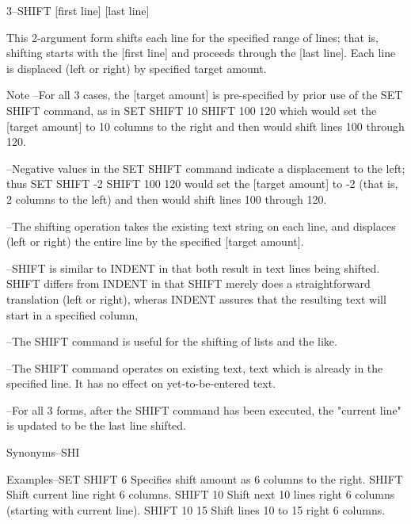        3--SHIFT   [first line]   [last line]
 
          This 2-argument form shifts each line
          for the specified range of lines; that is,
          shifting starts with the   [first line]
          and proceeds through the   [last line].
          Each line is displaced (left or right) by
          specified target amount.
 
Note    --For all 3 cases, the    [target amount]
          is pre-specified by prior use of the
          SET SHIFT command, as in
             SET SHIFT 10
             SHIFT 100 120
          which would set the [target amount] to 10
          columns to the right and then would
          shift lines 100 through 120.
 
        --Negative values in the SET SHIFT command
          indicate a displacement to the left; thus
             SET SHIFT -2
             SHIFT 100 120
          would set the [target amount] to -2
          (that is, 2 columns to the left) and then
          would shift lines 100 through 120.
 
        --The shifting operation takes the existing
          text string on each line, and displaces (left
          or right) the entire line by the specified
          [target amount].
 
        --SHIFT is similar to INDENT in that
          both result in text lines being shifted.
          SHIFT differs from INDENT in that
          SHIFT merely does a straightforward
          translation (left or right), wheras
          INDENT assures that the resulting text
          will start in a specified column,
 
        --The SHIFT command is useful for the
          shifting of lists and the like.
 
        --The SHIFT command operates on existing text,
          text which is already in the specified line.
          It has no effect on yet-to-be-entered text.
 
        --For all 3 forms, after the SHIFT command
          has been executed, the "current line" is
          updated to be the last line shifted.
 
Synonyms--SHI
 
Examples--SET SHIFT 6       Specifies shift amount as
                            6 columns to the right.
          SHIFT             Shift current line right 6 columns.
          SHIFT 10          Shift next 10 lines right 6 columns
                            (starting with current line).
          SHIFT 10 15       Shift lines 10 to 15 right 6 columns.
 
